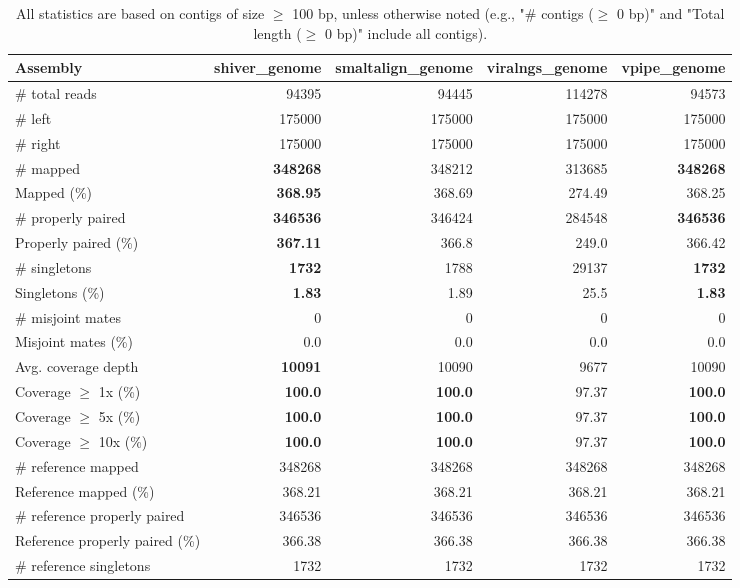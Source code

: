 \documentclass[12pt,a4paper]{article}
\begin{document}
\begin{table}[ht]
\begin{center}
\caption{All statistics are based on contigs of size $\geq$ 100 bp, unless otherwise noted (e.g., "\# contigs ($\geq$ 0 bp)" and "Total length ($\geq$ 0 bp)" include all contigs).}
\begin{tabular}{|l*{4}{|r}|}
\hline
Assembly & shiver\_genome & smaltalign\_genome & viralngs\_genome & vpipe\_genome \\ \hline
\# total reads & 94395 & 94445 & 114278 & 94573 \\ \hline
\# left & 175000 & 175000 & 175000 & 175000 \\ \hline
\# right & 175000 & 175000 & 175000 & 175000 \\ \hline
\# mapped & {\bf 348268} & 348212 & 313685 & {\bf 348268} \\ \hline
Mapped (\%) & {\bf 368.95} & 368.69 & 274.49 & 368.25 \\ \hline
\# properly paired & {\bf 346536} & 346424 & 284548 & {\bf 346536} \\ \hline
Properly paired (\%) & {\bf 367.11} & 366.8 & 249.0 & 366.42 \\ \hline
\# singletons & {\bf 1732} & 1788 & 29137 & {\bf 1732} \\ \hline
Singletons (\%) & {\bf 1.83} & 1.89 & 25.5 & {\bf 1.83} \\ \hline
\# misjoint mates & 0 & 0 & 0 & 0 \\ \hline
Misjoint mates (\%) & 0.0 & 0.0 & 0.0 & 0.0 \\ \hline
Avg. coverage depth & {\bf 10091} & 10090 & 9677 & 10090 \\ \hline
Coverage $\geq$ 1x (\%) & {\bf 100.0} & {\bf 100.0} & 97.37 & {\bf 100.0} \\ \hline
Coverage $\geq$ 5x (\%) & {\bf 100.0} & {\bf 100.0} & 97.37 & {\bf 100.0} \\ \hline
Coverage $\geq$ 10x (\%) & {\bf 100.0} & {\bf 100.0} & 97.37 & {\bf 100.0} \\ \hline
\# reference mapped & 348268 & 348268 & 348268 & 348268 \\ \hline
Reference mapped (\%) & 368.21 & 368.21 & 368.21 & 368.21 \\ \hline
\# reference properly paired & 346536 & 346536 & 346536 & 346536 \\ \hline
Reference properly paired (\%) & 366.38 & 366.38 & 366.38 & 366.38 \\ \hline
\# reference singletons & 1732 & 1732 & 1732 & 1732 \\ \hline

\end{tabular}
\end{center}
\end{table}
\end{document}
